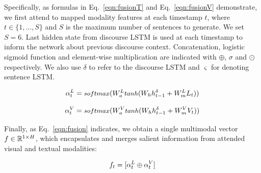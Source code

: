 \documentclass[11pt,a4paper]{article}
\newcommand{\R}{\mathbb{R}}
\begin{document}
Specifically, as formulas in Eq.~\ref{eqn:fusionT} and Eq.~\ref{eqn:fusionV} demonstrate, we first attend to mapped modality features at each timestamp $t$, where $t \in \{1, ..., S\}$ and $S$ is the maximum number of sentences to generate.
We set $S=6$.
Last hidden state from discourse LSTM is used at each timestamp to inform the network about previous discourse context.
Concatenation, logistic sigmoid function and element-wise multiplication are indicated with $\oplus$, $\sigma$ and $\odot$ respectively.
We also use $\delta$ to refer to the discourse LSTM and $\varsigma$ for denoting sentence LSTM.

\begin{equation}
  \alpha_t\sp{L} = \text{\small $softmax$}( W_a\sp{L} \text{\small $tanh$} (W_h h\sp{\delta}_{t-1} + W_{m}\sp{L} L_t) )
\label{eqn:fusionT}
\end{equation}

\begin{equation}
  \alpha_t\sp{V} = \text{\small $softmax$}( W_a\sp{V} \text{\small $tanh$} (W_h h\sp{\delta}_{t-1} + W_{m}\sp{V} V_t) )
\label{eqn:fusionV}
\end{equation}

Finally, as Eq.~\ref{eqn:fusion} indicates, we obtain a single multimodal vector $f \in \R\sp{1 \times H}$, which encapsulates and merges salient information from attended visual and textual modalities:

\begin{equation}
	f_t = [ \alpha_t\sp{L} \oplus \alpha_t\sp{V} ]
\label{eqn:fusion}
\end{equation}

\end{document}
